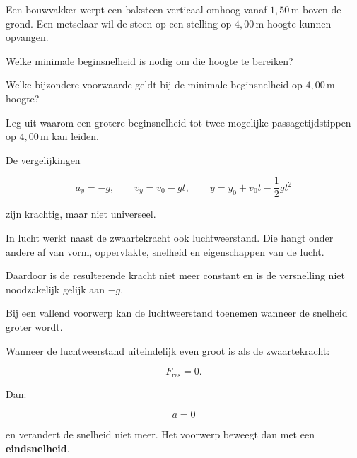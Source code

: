 \documentclass{ximera}
\begin{document}
\begin{oefening}[De baksteen]{\oefU\ESS}

Een bouwvakker werpt een baksteen verticaal omhoog vanaf
$1,50\,\mathrm{m}$ boven de grond. Een metselaar wil de steen op een
stelling op $4,00\,\mathrm{m}$ hoogte kunnen opvangen.

\begin{question}
Welke minimale beginsnelheid is nodig om die hoogte te bereiken?
\end{question}

\begin{question}
Welke bijzondere voorwaarde geldt bij de minimale beginsnelheid op
$4,00\,\mathrm{m}$ hoogte?
\end{question}

\begin{question}
Leg uit waarom een grotere beginsnelheid tot twee mogelijke
passagetijdstippen op $4,00\,\mathrm{m}$ kan leiden.
\end{question}

\end{oefening}




De vergelijkingen

\[
a_y=-g,
\qquad
v_y=v_0-gt,
\qquad
y=y_0+v_0t-\frac12gt^2
\]

zijn krachtig, maar niet universeel.

In lucht werkt naast de zwaartekracht ook luchtweerstand. Die hangt
onder andere af van vorm, oppervlakte, snelheid en eigenschappen van
de lucht.

Daardoor is de resulterende kracht niet meer constant en is de
versnelling niet noodzakelijk gelijk aan $-g$.



Bij een vallend voorwerp kan de luchtweerstand toenemen wanneer de
snelheid groter wordt.

Wanneer de luchtweerstand uiteindelijk even groot is als de
zwaartekracht:

\[
F_{\mathrm{res}}=0.
\]

Dan:

\[
a=0
\]

en verandert de snelheid niet meer. Het voorwerp beweegt dan met een
\textbf{eindsnelheid}.
\end{document}
